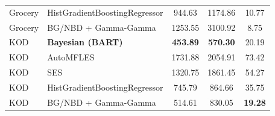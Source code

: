 \documentclass[11pt]{amsart}
\theoremstyle{definition}
\begin{document}
\begin{table}[H]
\begin{tabular}{llccc}
        Grocery          & HistGradientBoostingRegressor & 944.63       & 1174.86       & 10.77              \\
        Grocery          & BG/NBD + Gamma-Gamma          & 1253.55  	& 3100.92	    & 8.75              \\
        \hline
        KOD              & \textbf{Bayesian (BART)}      & \textbf{453.89}       & \textbf{570.30}        & 20.19              \\
        KOD              & AutoMFLES                     & 1731.88      & 2054.91       & 73.42              \\
        KOD              & SES                           & 1320.75      & 1861.45       & 54.27              \\
        KOD              & HistGradientBoostingRegressor & 745.79       & 864.66        & 35.75              \\
        KOD              & BG/NBD + Gamma-Gamma          & 514.61       & 830.05        & \textbf{19.28}              \\
        \hline
    \end{tabular}
\end{table}



\end{document}
